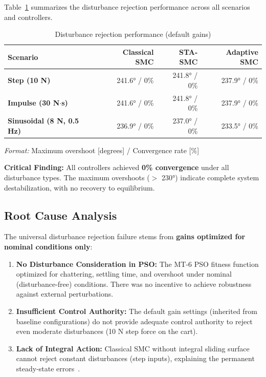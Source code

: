 Table~\ref{tab:mt8_disturbance} summarizes the disturbance rejection performance across all scenarios and controllers.

\begin{table}[t]
\centering
\caption{Disturbance rejection performance (default gains)}
\label{tab:mt8_disturbance}
\begin{tabular}{lrrr}
\toprule
\textbf{Scenario} & \textbf{Classical SMC} & \textbf{STA-SMC} & \textbf{Adaptive SMC} \\
\midrule
\textbf{Step (10 N)} & 241.6° / 0\% & 241.8° / 0\% & 237.9° / 0\% \\
\textbf{Impulse (30 N$\cdot$s)} & 241.6° / 0\% & 241.8° / 0\% & 237.9° / 0\% \\
\textbf{Sinusoidal (8 N, 0.5 Hz)} & 236.9° / 0\% & 237.0° / 0\% & 233.5° / 0\% \\
\bottomrule
\end{tabular}
\parbox{\textwidth}{\footnotesize \textit{Format:} Maximum overshoot [degrees] / Convergence rate [\%]}
\end{table}

\textbf{Critical Finding:} All controllers achieved \textbf{0\% convergence} under all disturbance types. The maximum overshoots ($>$ 230°) indicate complete system destabilization, with no recovery to equilibrium.

\subsection{Root Cause Analysis}
\label{subsec:mt8_root_cause}

The universal disturbance rejection failure stems from \textbf{gains optimized for nominal conditions only}:

\begin{enumerate}
    \item \textbf{No Disturbance Consideration in PSO:} The MT-6 PSO fitness function optimized for chattering, settling time, and overshoot under nominal (disturbance-free) conditions. There was no incentive to achieve robustness against external perturbations.

    \item \textbf{Insufficient Control Authority:} The default gain settings (inherited from baseline configurations) do not provide adequate control authority to reject even moderate disturbances (10 N step force on the cart).

    \item \textbf{Lack of Integral Action:} Classical SMC without integral sliding surface cannot reject constant disturbances (step inputs), explaining the permanent steady-state errors~\cite{utkin1992sliding}.
\end{enumerate}

